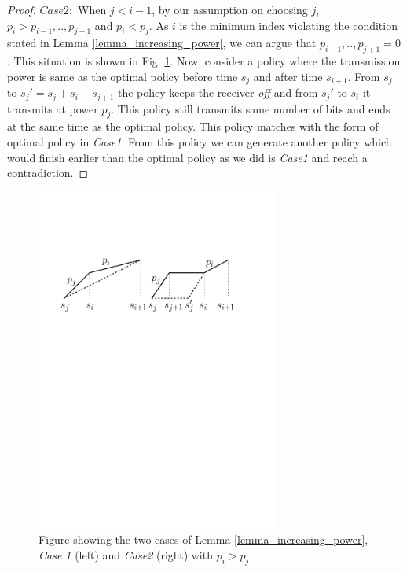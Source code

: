 \begin{proof}
$Case 2:$ When $j<i-1$, by our assumption on choosing $j$, $p_i>p_{i-1},..,p_{j+1}$ and $p_i<p_{j}$. As $i$ is the minimum index violating the condition stated in Lemma \ref{lemma_increasing_power}, we can argue that $p_{i-1},..,p_{j+1}=0$. This situation is shown in Fig. \ref{Lemma1}. Now, consider a policy where the transmission power is same as the optimal policy before time $s_j$ and after time $s_{i+1}$. From $s_j$ to $s_j'=s_j+s_{i}-s_{j+1}$ the policy keeps the receiver \textit{off} and from $s_j'$ to $s_{i}$ it transmits at power $p_j$. This policy still transmits same number of bits and ends at the same time as the optimal policy. This policy matches with the form of optimal policy in \textit{Case1}. From this policy we can generate another policy which would finish earlier than the optimal policy as we did is \textit{Case1} and reach a contradiction. 
\end{proof}

\begin{figure}[htb]
  \centering
  \centerline{\includegraphics[width=8cm]{Lemma1.pdf}}
\caption{Figure showing the two cases of Lemma \ref{lemma_increasing_power}, \textit{Case 1} (left)  and \textit{Case2} (right) with $p_i>p_j$.}\label{Lemma1}
\end{figure}

